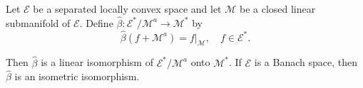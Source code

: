 Let $\mathcal{E}$ be a separated locally convex space and let $\mathcal{M}$ be a closed linear submanifold of $\mathcal{E}$. Define $\hat{\beta}: \mathcal{E}^* / \mathcal{M}^a \to \mathcal{M}^*$ by
$$\hat{\beta}(f + \mathcal{M}^a) = f|_{\mathcal{M}}, \quad f \in \mathcal{E}^*.$$

Then $\hat{\beta}$ is a linear isomorphism of $\mathcal{E}^* / \mathcal{M}^a$ onto $\mathcal{M}^*$. If $\mathcal{E}$ is a Banach space, then $\hat{\beta}$ is an isometric isomorphism.
